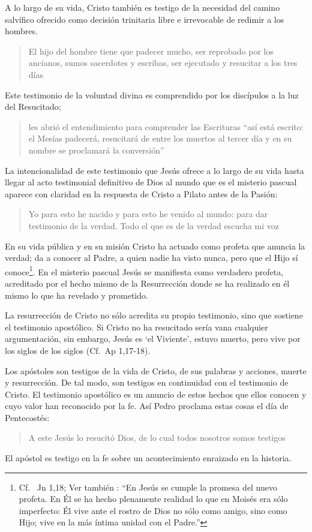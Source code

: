 A lo largo de su vida, Cristo también es testigo de la necesidad del camino salvífico ofrecido como decisión trinitaria libre e irrevocable de redimir a los hombres\autocite[Cf.~][128]{prades2015testimonio}. \blockquote[][\,(Mc 8,31)]{El hijo del hombre tiene que padecer mucho, ser reprobado por los ancianos, sumos sacerdotes y escribas, ser ejecutado y resucitar a los tres días}. Este testimonio de la voluntad divina es comprendido por los discípulos a la luz del Resucitado; \blockquote[][\,(Cf.~Lc 24,45-47a)]{les abrió el entendimiento para comprender las Escrituras \textelp{} ``así está escrito: el Mesías padecerá, resucitará de entre los muertos al tercer día y en su nombre se proclamará la conversión''}.

La intencionalidad de este testimonio que Jesús ofrece a lo largo de su vida hasta llegar al acto testimonial definitivo de Dios al mundo que es el misterio pascual aparece con claridad en la respuesta de Cristo a Pilato antes de la Pasión: \blockquote[][\,(Jn 18,37)]{Yo para esto he nacido y para esto he venido al mundo: para dar testimonio de la verdad. Todo el que es de la verdad escucha mi voz}. En su vida pública y en su misión Cristo ha actuado como profeta que anuncia la verdad; da a conocer al Padre, a quien nadie ha visto nunca, pero que el Hijo sí conoce\footnote{Cf.~ Jn 1,18; Ver también \cite[28]{ratzinger2007jdenaz}: \enquote{En Jesús se cumple la promesa del nuevo profeta. En Él se ha hecho plenamente realidad lo que en Moisés era sólo imperfecto: Él vive ante el rostro de Dios no sólo como amigo, sino como Hijo; vive en la más íntima unidad con el Padre.}}. En el misterio pascual Jesús se manifiesta como verdadero profeta, acreditado por el hecho mismo de la Resurrección donde se ha realizado en él mismo lo que ha revelado y prometido\autocite[128]{prades2015testimonio}.

La resurrección de Cristo no sólo acredita su propio testimonio, sino que sostiene el testimonio apostólico. Si Cristo no ha resucitado sería vana cualquier argumentación, sin embargo, Jesús es `el Viviente', estuvo muerto, pero vive por los siglos de los siglos (Cf.~Ap 1,17-18).

Los apóstoles son testigos de la vida de Cristo, de sus palabras y acciones, muerte y resurrección. De tal modo, son testigos en continuidad con el testimonio de Cristo. El testimonio apostólico es un anuncio de estos hechos que ellos conocen y cuyo valor han reconocido por la fe. Así Pedro proclama estas cosas el día de Pentecostés: \blockquote[][\,(Hch 2,32)]{A este Jesús lo resucitó Dios, de lo cual todos nosotros somos testigos}. El apóstol es testigo en la fe sobre un acontecimiento enraizado en la historia\autocite[Cf.~][402; 406]{ninot2009tf}.

